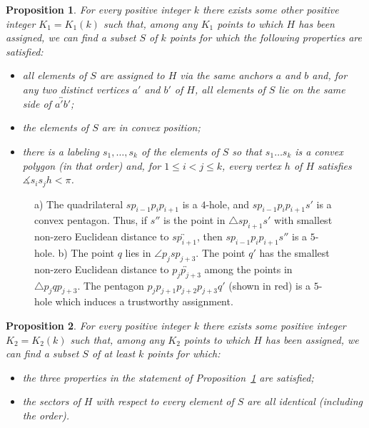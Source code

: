 \documentclass[10pt,a4paper]{amsart}
\newtheorem{proposition}{Proposition}
\begin{document}
\begin{proposition}\label{prop:first_structure}
For every positive integer $k$ there exists some other positive integer $K_1=K_1(k)$ such that, among any $K_1$ points to which $H$ has been assigned, we can find a subset $S$ of $k$ points for which the following properties are satisfied:
\begin{itemize}
    \item all elements of $S$ are assigned to $H$ via the same anchors $a$ and $b$ and, for any two distinct vertices $a'$ and $b'$ of $H$, all elements of $S$ lie on the same side of $\overleftrightarrow{a'b'}$;

    \item the elements of $S$ are in convex position;

    \item there is a labeling $s_1,\dots,s_{k}$ of the elements of $S$ so that $s_1\dots s_k$ is a convex polygon (in that order) and, for $1\leq i<j\leq k$, every vertex $h$ of $H$ satisfies $\measuredangle s_is_jh<\pi$.
\end{itemize}
\end{proposition}

\begin{figure}[h]
    \centering
    
    \caption{a) The quadrilateral $sp_{i-1}p_ip_{i+1}$ is a $4$-hole, and $sp_{i-1}p_ip_{i+1}s'$ is a convex pentagon. Thus, if $s''$ is the point in $\triangle sp_{i+1}s'$ with smallest non-zero Euclidean distance to $\overleftrightarrow{sp_{i+1}}$, then $sp_{i-1}p_ip_{i+1}s''$ is a $5$-hole. b) The point $q$ lies in $\angle p_{j}sp_{j+3}$. The point $q'$ has the smallest non-zero Euclidean distance to $\overleftrightarrow{p_jp_{j+3}}$ among the points in $\triangle p_jqp_{j+3}$. The pentagon $p_jp_{j+1}p_{j+2}p_{j+3}q'$ (shown in red) is a $5$-hole which induces a trustworthy assignment.}
    \label{fig:pushing_from_top}
\end{figure}

\begin{proposition}\label{prop:second_structure}
For every positive integer $k$ there exists some positive integer $K_2=K_2(k)$ such that, among any $K_2$ points to which $H$ has been assigned, we can find a subset $S$ of at least $k$ points for which: 
\begin{itemize}
    \item the three properties in the statement of Proposition~\ref{prop:first_structure} are satisfied;

    \item the sectors of $H$ with respect to every element of $S$ are all identical (including the order).
\end{itemize}
\end{proposition}
\end{document}
